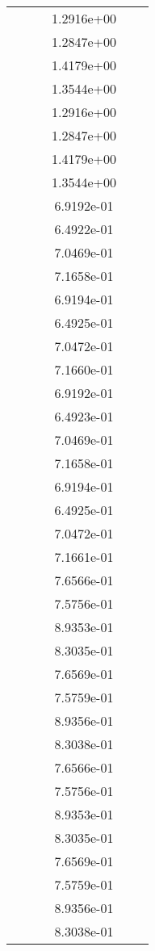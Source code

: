\begin{xltabular}{\textwidth}{r|rS[table-format=1.3e+2]S[table-format=1.4e+2]S[table-format=1.4e+2]S[table-format=-1.5]}
&  &  & 1.2916e+00 & & \\
&  &  & 1.2847e+00 & & \\
&  &  & 1.4179e+00 & & \\
&  &  & 1.3544e+00 & & \\
&  &  & 1.2916e+00 & & \\
&  &  & 1.2847e+00 & & \\
&  &  & 1.4179e+00 & & \\
&  &  & 1.3544e+00 & & \\
&  &  & 6.9192e-01 & & \\
&  &  & 6.4922e-01 & & \\
&  &  & 7.0469e-01 & & \\
&  &  & 7.1658e-01 & & \\
&  &  & 6.9194e-01 & & \\
&  &  & 6.4925e-01 & & \\
&  &  & 7.0472e-01 & & \\
&  &  & 7.1660e-01 & & \\
&  &  & 6.9192e-01 & & \\
&  &  & 6.4923e-01 & & \\
&  &  & 7.0469e-01 & & \\
&  &  & 7.1658e-01 & & \\
&  &  & 6.9194e-01 & & \\
&  &  & 6.4925e-01 & & \\
&  &  & 7.0472e-01 & & \\
&  &  & 7.1661e-01 & & \\
&  &  & 7.6566e-01 & & \\
&  &  & 7.5756e-01 & & \\
&  &  & 8.9353e-01 & & \\
&  &  & 8.3035e-01 & & \\
&  &  & 7.6569e-01 & & \\
&  &  & 7.5759e-01 & & \\
&  &  & 8.9356e-01 & & \\
&  &  & 8.3038e-01 & & \\
&  &  & 7.6566e-01 & & \\
&  &  & 7.5756e-01 & & \\
&  &  & 8.9353e-01 & & \\
&  &  & 8.3035e-01 & & \\
&  &  & 7.6569e-01 & & \\
&  &  & 7.5759e-01 & & \\
&  &  & 8.9356e-01 & & \\
&  &  & 8.3038e-01 & & \\

\end{xltabular}

